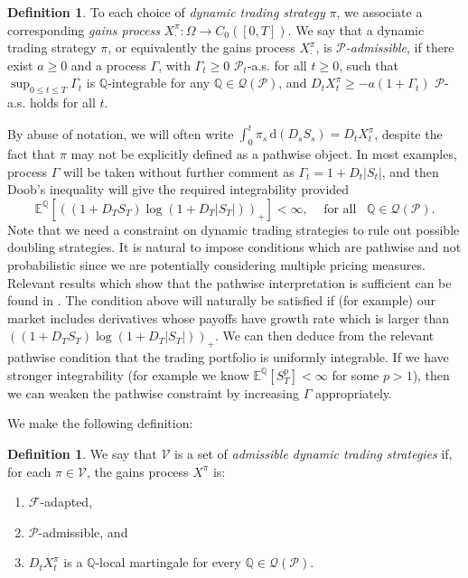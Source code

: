 \documentclass[a4paper]{amsart}
\newtheorem{assumption}[theorem]{Assumption}
\theoremstyle{definition}
\newtheorem{definition}[theorem]{Definition}
\theoremstyle{remark}
\numberwithin{equation}{section}
\newcommand{\E}{\mathbb{E}}
\newcommand{\Q}{\mathbb{Q}}
\newcommand{\di}{\mathrm{d}}
\newcommand{\as}{a.s.}
\newcommand{\F}{\mathcal{F}}
\newcommand{\Eq}[1]{\E^{\Q}\left[#1\right]}
\newcommand{\Pc}{\mathcal{P}}
\newcommand{\Qc}{\mathcal{Q}}
\newcommand{\Vc}{\mathcal{V}}
\begin{document}
\begin{definition}
  To each choice of \emph{dynamic trading strategy} $\pi$, we associate a corresponding \emph{gains process} $X_\cdot^\pi: \Omega \to C_0([0,T])$. We say that a dynamic trading strategy $\pi$, or equivalently the gains process $X^\pi_\cdot$, is \emph{$\Pc$-admissible}, if there exist $a \ge 0$ and  a process $\Gamma$, with $\Gamma_t \ge 0$ $\Pc_t$-\as{} for all $t \ge 0$, such that $\sup_{0 \le t \le T} \Gamma_t$ is $\Q$-integrable for any $\Q \in \Qc(\Pc)$, and  $D_t X_t^\pi \ge -a(1+\Gamma_t)$ $\Pc$-\as{} holds for all $t$.
\end{definition}
By abuse of notation, we will often write $\int_0^t \pi_s \, \di(D_sS_s) = D_t X_t^\pi$, despite the fact that $\pi$ may not be explicitly defined as a pathwise object.
In most examples, process $\Gamma$ will be taken without further comment as $\Gamma_t = 1 + D_t |S_t|$, and then Doob's inequality will give the required integrability provided 
$$\Eq{((1+D_T S_T) \log (1+D_T|S_T|))_+} < \infty,\;\;\;\text{ for all}\;\;\; \Q \in \Qc(\Pc).$$
Note that we need a constraint on dynamic trading strategies to rule out possible doubling strategies. It is natural to impose conditions which are pathwise and not probabilistic since we are potentially considering multiple pricing measures. Relevant results which show that the pathwise interpretation is sufficient can be found in \cite{acciaio_trajectorial_2013}. The condition above will naturally be satisfied if (for example) our market includes derivatives whose payoffs have growth rate which is larger than $((1+D_T S_T) \log (1+D_T|S_T|))_+$. We can then deduce from the relevant pathwise condition that the trading portfolio is uniformly integrable. If we have stronger integrability (for example we know $\Eq{S_T^p} < \infty$ for some $p>1$), then we can weaken the pathwise constraint by increasing $\Gamma$ appropriately.


We make the following definition:
\begin{definition} \label{def:dynam-trad-strat}
  We say that $\Vc$ is a set of \emph{admissible dynamic trading strategies} if, for each $\pi \in \Vc$, the gains process $X^\pi$ is:
  \begin{enumerate}
  \item $\F$-adapted,
  \item $\Pc$-admissible, and
  \item $D_t X_t^\pi$ is a $\Q$-local martingale for every $\Q \in \Qc(\Pc)$.
  \end{enumerate}
\end{definition}
\end{document}
